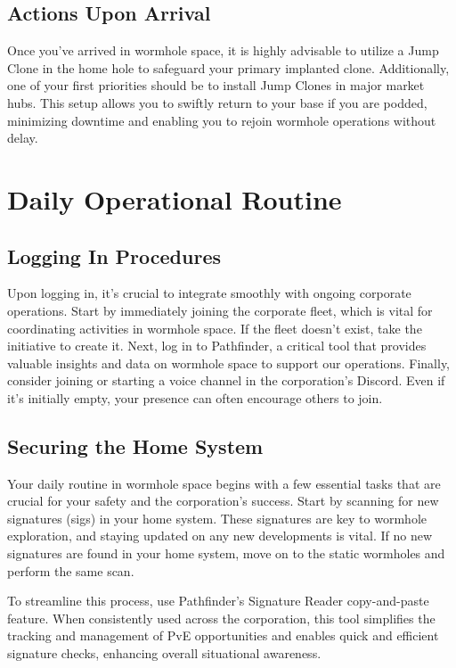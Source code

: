 \documentclass[a4paper,12pt]{article}
\begin{document}
\subsection{Actions Upon Arrival}

Once you’ve arrived in wormhole space, it is highly advisable to utilize a Jump Clone in the home hole to safeguard your primary implanted clone. Additionally, one of your first priorities should be to install Jump Clones in major market hubs. This setup allows you to swiftly return to your base if you are podded, minimizing downtime and enabling you to rejoin wormhole operations without delay.

\section{Daily Operational Routine}

\subsection{Logging In Procedures}

Upon logging in, it’s crucial to integrate smoothly with ongoing corporate operations. Start by immediately joining the corporate fleet, which is vital for coordinating activities in wormhole space. If the fleet doesn’t exist, take the initiative to create it. Next, log in to Pathfinder, a critical tool that provides valuable insights and data on wormhole space to support our operations. Finally, consider joining or starting a voice channel in the corporation’s Discord. Even if it’s initially empty, your presence can often encourage others to join.

\subsection{Securing the Home System}

Your daily routine in wormhole space begins with a few essential tasks that are crucial for your safety and the corporation’s success. Start by scanning for new signatures (sigs) in your home system. These signatures are key to wormhole exploration, and staying updated on any new developments is vital. If no new signatures are found in your home system, move on to the static wormholes and perform the same scan.

To streamline this process, use Pathfinder’s Signature Reader copy-and-paste feature. When consistently used across the corporation, this tool simplifies the tracking and management of PvE opportunities and enables quick and efficient signature checks, enhancing overall situational awareness.
\end{document}
